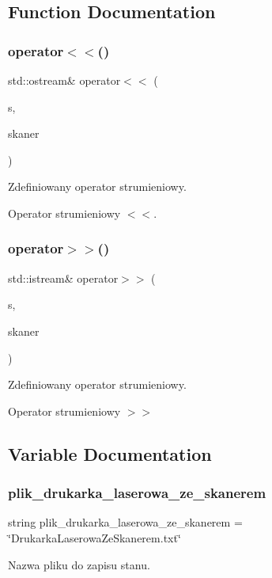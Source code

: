 \subsection{Function Documentation}
\mbox{\label{_drukarka_laserowa_ze_skanerem_8cpp_ab3d71d7a2059d279e4f7e3df02f89e5f}} 
\subsubsection{operator$<$$<$()}
{\footnotesize\ttfamily std\+::ostream\& operator$<$$<$ (\begin{DoxyParamCaption}\item[{std\+::ostream \&}]{s,  }\item[{\textbf{ Drukarka\+Laserowa\+Ze\+Skanerem} \&}]{skaner }\end{DoxyParamCaption})}



Zdefiniowany operator strumieniowy. 

Operator strumieniowy $<$$<$. \mbox{\label{_drukarka_laserowa_ze_skanerem_8cpp_a664f0d835b6108a7be0b418d5a49c307}} 
\subsubsection{operator$>$$>$()}
{\footnotesize\ttfamily std\+::istream\& operator$>$$>$ (\begin{DoxyParamCaption}\item[{std\+::istream \&}]{s,  }\item[{\textbf{ Drukarka\+Laserowa\+Ze\+Skanerem} \&}]{skaner }\end{DoxyParamCaption})}



Zdefiniowany operator strumieniowy. 

Operator strumieniowy $>$$>$ 

\subsection{Variable Documentation}
\mbox{\label{_drukarka_laserowa_ze_skanerem_8cpp_a955d601d2de0c93a4d90afb67ba024ea}} 
\subsubsection{plik\+\_\+drukarka\+\_\+laserowa\+\_\+ze\+\_\+skanerem}
{\footnotesize\ttfamily string plik\+\_\+drukarka\+\_\+laserowa\+\_\+ze\+\_\+skanerem = \char`\"{}Drukarka\+Laserowa\+Ze\+Skanerem.\+txt\char`\"{}}



Nazwa pliku do zapisu stanu. 

